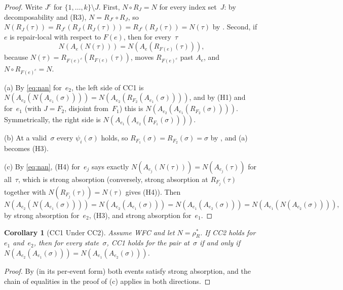 \documentclass[11pt,a4paper]{article}
\theoremstyle{plain}
\newtheorem{corollary}[theorem]{Corollary}
\theoremstyle{definition}
\theoremstyle{remark}
\renewcommand{\_}{\textunderscore\allowbreak}
\begin{document}
\begin{proof}
Write $J^c$ for $\{1, \ldots, k\} \setminus J$.  First, $N \circ R_J = N$ for
every index set~$J$: by decomposability and (R3), $N = R_{J^c} \circ R_J$, so
$N(R_J(\tau)) = R_{J^c}(R_J(R_J(\tau))) = R_{J^c}(R_J(\tau)) = N(\tau)$ by
.  Second, if $e$ is repair-local with respect to
$F(e)$, then for every~$\tau$
\begin{equation}
\label{eq:nan}
N(A_e(N(\tau))) = N(A_e(R_{F(e)}(\tau))),
\end{equation}
because $N(\tau) = R_{F(e)^c}(R_{F(e)}(\tau))$, 
moves $R_{F(e)^c}$ past $A_e$, and $N \circ R_{F(e)^c} = N$.

(a) By \eqref{eq:nan} for~$e_2$, the left side of CC1 is
$N(A_{e_2}(N(A_{e_1}(\sigma)))) = N(A_{e_2}(R_{F_2}(A_{e_1}(\sigma))))$, and
by (H1) and  for~$e_1$ (with $J = F_2$, disjoint
from~$F_1$) this is $N(A_{e_2}(A_{e_1}(R_{F_2}(\sigma))))$.  Symmetrically,
the right side is $N(A_{e_1}(A_{e_2}(R_{F_1}(\sigma))))$.

(b) At a valid~$\sigma$ every $\psi_i(\sigma)$ holds, so
$R_{F_1}(\sigma) = R_{F_2}(\sigma) = \sigma$ by
, and (a) becomes (H3).

(c) By \eqref{eq:nan}, (H4) for~$e_j$ says exactly
$N(A_{e_j}(N(\tau))) = N(A_{e_j}(\tau))$ for all~$\tau$, which is strong
absorption (conversely, strong absorption at $R_{F_j}(\tau)$ together with
$N(R_{F_j}(\tau)) = N(\tau)$ gives (H4)).  Then
\[
N(A_{e_2}(N(A_{e_1}(\sigma)))) = N(A_{e_2}(A_{e_1}(\sigma)))
= N(A_{e_1}(A_{e_2}(\sigma))) = N(A_{e_1}(N(A_{e_2}(\sigma)))),
\]
by strong absorption for~$e_2$, (H3), and strong absorption for~$e_1$.
\end{proof}

\begin{corollary}[CC1 Under CC2]
\label{cor:cc1-under-cc2}
Assume WFC and let $N = \rho_R^*$.  If CC2 holds for $e_1$ and~$e_2$, then
for every state~$\sigma$, CC1 holds for the pair at~$\sigma$ if and only if
$N(A_{e_2}(A_{e_1}(\sigma))) = N(A_{e_1}(A_{e_2}(\sigma)))$.
\end{corollary}

\begin{proof}
By  (in its per-event form) both events satisfy
strong absorption, and the chain of equalities in the proof of
(c) applies in both directions.
\end{proof}
\end{document}
